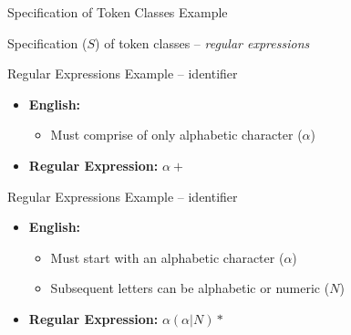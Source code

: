 \documentclass{beamer}
\begin{document}
\begin{frame}{Specification of Token Classes}
{Example}

\begin{center}
\end{center}

\pause
Specification ($S$) of token classes \pause -- \emph{regular expressions}
\end{frame}

\begin{frame}[fragile]{Regular Expressions}
{Example -- identifier}
\begin{itemize}
	\item \textbf{\color{BrickRed}English:}
	\begin{itemize}
		\item Must comprise of only alphabetic character ($\alpha$)
	\end{itemize}
	\pause
	\item \textbf{\color{BrickRed}Regular Expression: }$\alpha+$
\end{itemize}
\end{frame}


\begin{frame}[fragile]{Regular Expressions}
{Example -- identifier}
\begin{itemize}
	\item \textbf{\color{BrickRed}English:}
	\begin{itemize}
		\item Must start with an alphabetic character ($\alpha$)
		\item Subsequent letters can be alphabetic or numeric ($N$)
	\end{itemize}
	\pause
	\item \textbf{\color{BrickRed}Regular Expression: }$\alpha (\alpha | N)*$
\end{itemize}
\end{frame}
\end{document}
